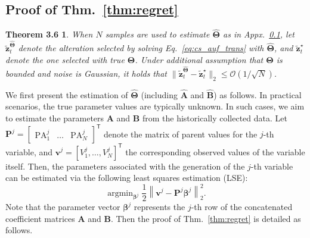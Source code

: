 \documentclass{article}
\theoremstyle{plain}
\newtheorem*{theorem36}{Theorem 3.6}
\theoremstyle{definition}
\theoremstyle{remark}
\def \Eq {Eq.}
\def \thm {Thm.}
\def \P {\mathbf{P}}
\def \A {\mathbf{A}}
\def \PA {\operatorname{PA}}
\def \B {\mathbf{B}}
\def \v {\mathbf{v}}
\def \z {\mathbf{z}}
\begin{document}
\subsection{Proof of \thm~\ref{thm:regret}}
\label{app:estimate}

\begin{theorem36}
  When \(N\) samples are used to estimate \(\hat{\bm{\Theta}}\) as in Appx.~\ref{app:estimate}, let \(\tilde{\z}_t^{\hat{\bm{\Theta}}}\) denote the alteration selected by solving \Eq~\eqref{eq:cs_auf_trans} with \(\hat{\bm{\Theta}}\), and \(\tilde{\z}_t^\star\) denote the one selected with true \(\bm{\Theta}\). 
  Under additional assumption that \(\bm{\Theta}\) is bounded and noise is Gaussian, it holds that
  \(
  \|\tilde{\z}_t^{\hat{\bm{\Theta}}} - \tilde{\z}_t^\star \|_2 \leq \mathcal{O}(1/\sqrt{N} )
  \).
\end{theorem36}

We first present the estimation of \(\hat{\bm{\Theta}}\) (including \(\hat{\A}\) and \(\hat{\B}\)) as follows. 
In practical scenarios, the true parameter values are typically unknown. In such cases, we aim to estimate the parameters \(\A\) and \(\B\) from the historically collected data.  
Let \(\P^{j} = \begin{bmatrix}\PA^{j}_{1} & \ldots & \PA^{j}_{N} \end{bmatrix}^\mathsf{T}\) denote the matrix of parent values for the \(j\)-th variable, and \(\v^{j} = \left[V^{j}_{1}, \ldots, V^{j}_{N}\right]^\mathsf{T}\) the corresponding observed values of the variable itself.  
Then, the parameters associated with the generation of the \(j\)-th variable can be estimated via the following least squares estimation (LSE):
  \[
    \mathop{\arg\min}_{\bm{\beta}^{j}}  \frac{1}{2}\left\|\v^{j}-\P^{j}\bm{\beta}^{j}\right\|_2^2. 
  \]
  Note that the parameter vector \(\bm{\beta}^{j}\) represents the \(j\)-th row of the concatenated coefficient matrices \(\A\) and \(\B\). Then the proof of \thm~\ref{thm:regret} is detailed as follows.
 
\end{document}

